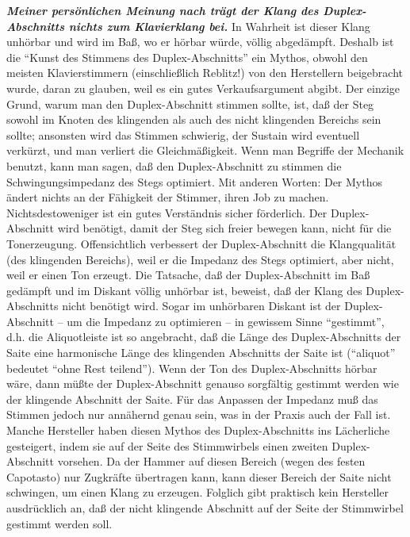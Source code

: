 \textbf{\textit{Meiner persönlichen Meinung nach trägt der Klang des Duplex-Abschnitts nichts zum Klavierklang bei.}}
In Wahrheit ist dieser Klang unhörbar und wird im Baß, wo er hörbar würde, völlig abgedämpft.
Deshalb ist die \enquote{Kunst des Stimmens des Duplex-Abschnitts} ein Mythos, obwohl den meisten Klavierstimmern (einschließlich Reblitz!) von den Herstellern beigebracht wurde, daran zu glauben, weil es ein gutes Verkaufsargument abgibt.
Der einzige Grund, warum man den Duplex-Abschnitt stimmen sollte, ist, daß der Steg sowohl im Knoten des klingenden als auch des nicht klingenden Bereichs sein sollte; ansonsten wird das Stimmen schwierig, der Sustain wird eventuell verkürzt, und man verliert die Gleichmäßigkeit.
Wenn man Begriffe der Mechanik benutzt, kann man sagen, daß den Duplex-Abschnitt zu stimmen die Schwingungsimpedanz des Stegs optimiert.
Mit anderen Worten: Der Mythos ändert nichts an der Fähigkeit der Stimmer, ihren Job zu machen.
Nichtsdestoweniger ist ein gutes Verständnis sicher förderlich.
Der Duplex-Abschnitt wird benötigt, damit der Steg sich freier bewegen kann, nicht für die Tonerzeugung.
Offensichtlich verbessert der Duplex-Abschnitt die Klangqualität (des klingenden Bereichs), weil er die Impedanz des Stegs optimiert, aber nicht, weil er einen Ton erzeugt.
Die Tatsache, daß der Duplex-Abschnitt im Baß gedämpft und im Diskant völlig unhörbar ist, beweist, daß der Klang des Duplex-Abschnitts nicht benötigt wird.
Sogar im unhörbaren Diskant ist der Duplex-Abschnitt -- um die Impedanz zu optimieren -- in gewissem Sinne \enquote{gestimmt}, d.h. die Aliquotleiste ist so angebracht, daß die Länge des Duplex-Abschnitts der Saite eine harmonische Länge des klingenden Abschnitts der Saite ist (\enquote{aliquot} bedeutet \enquote{ohne Rest teilend}).
Wenn der Ton des Duplex-Abschnitts hörbar wäre, dann müßte der Duplex-Abschnitt genauso sorgfältig gestimmt werden wie der klingende Abschnitt der Saite.
Für das Anpassen der Impedanz muß das Stimmen jedoch nur annähernd genau sein, was in der Praxis auch der Fall ist.
Manche Hersteller haben diesen Mythos des Duplex-Abschnitts ins Lächerliche gesteigert, indem sie auf der Seite des Stimmwirbels einen zweiten Duplex-Abschnitt vorsehen.
Da der Hammer auf diesen Bereich (wegen des festen Capotasto) nur Zugkräfte übertragen kann, kann dieser Bereich der Saite nicht schwingen, um einen Klang zu erzeugen.
Folglich gibt praktisch kein Hersteller ausdrücklich an, daß der nicht klingende Abschnitt auf der Seite der Stimmwirbel gestimmt werden soll.


\label{c2_5h}
